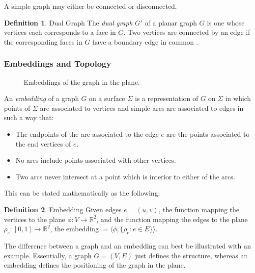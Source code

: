 \documentclass[11pt]{article}
\newcommand{\R}{\mathbb{R}}
\theoremstyle{definition}
\newtheorem{definition}{Definition}[section]
\begin{document}
	A simple graph may either be connected or disconnected.
  
  	\theoremstyle{definition}
	\begin{definition}{Dual Graph}
		The \emph{dual graph} $G'$ of a planar graph $G$ is one whose vertices each corresponds to a face in $G$. 
		Two vertices are connected by an edge if the corresponding faces in $G$ have a boundary edge in common \cite{mathworld:dualGraph}. 
  	\end{definition}
	
\subsubsection{Embeddings and Topology}
    
    \begin{figure}%
		\centering
		\qquad
		\caption[]{Embeddings of the graph in the plane.}%
		\label{fig:embedding}
	\end{figure}
    
    	An \emph{embedding} of a graph $G$ on a surface $\Sigma$ is a representation of $G$ on $\Sigma$ in which points of $\Sigma$ are associated to vertices and simple arcs are associated to edges in such a way that:
  		\begin{itemize}
			\item The endpoints of the arc associated to the edge $e$ are the points associated to the end vertices of $e$.
			\item No arcs include points associated with other vertices.
			\item Two arcs never intersect at a point which is interior to either of the arcs.
  		\end{itemize}

	This can be stated mathematically as the following: 
	\theoremstyle{definition}
	\begin{definition}{Embedding}
		Given edges $e=(u,v)$, the function mapping the vertices to the plane $ \phi :V \rightarrow \R^2$, and the function mapping the edges to the plane $ \rho_e :[0,1] \rightarrow \R^2$, the embedding $= \langle \phi, \{\rho_e : e \in E \} \rangle$. 
	\end{definition}
		The difference between a graph and an embedding can best be illustrated with an example. 
		Essentially, a graph $G=(V,E)$ just defines the structure, whereas an embedding defines the positioning of the graph in the plane.
	
\end{document}
